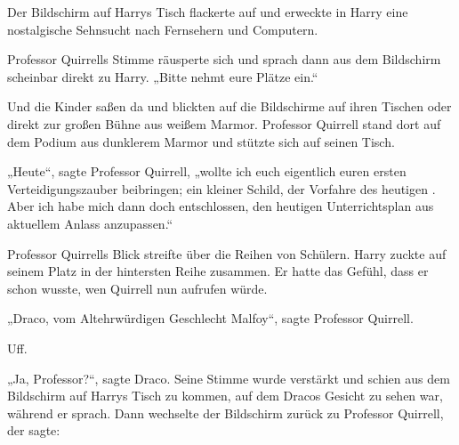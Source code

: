 Der Bildschirm auf Harrys Tisch flackerte auf und erweckte in Harry eine nostalgische Sehnsucht nach Fernsehern und Computern.

Professor Quirrells Stimme räusperte sich und sprach dann aus dem Bildschirm scheinbar direkt zu Harry. „Bitte nehmt eure Plätze ein.“

\later

Und die Kinder saßen da und blickten auf die Bildschirme auf ihren Tischen oder direkt zur großen Bühne aus weißem Marmor. Professor Quirrell stand dort auf dem Podium aus dunklerem Marmor und stützte sich auf seinen Tisch.

„Heute“, sagte Professor Quirrell, „wollte ich euch eigentlich euren ersten Verteidigungszauber beibringen; ein kleiner Schild, der Vorfahre des heutigen . Aber ich habe mich dann doch entschlossen, den heutigen Unterrichtsplan aus aktuellem Anlass anzupassen.“

Professor Quirrells Blick streifte über die Reihen von Schülern. Harry zuckte auf seinem Platz in der hintersten Reihe zusammen. Er hatte das Gefühl, dass er schon wusste, wen Quirrell nun aufrufen würde.

„Draco, vom Altehrwürdigen Geschlecht Malfoy“, sagte Professor Quirrell.

Uff.

„Ja, Professor?“, sagte Draco. Seine Stimme wurde verstärkt und schien aus dem Bildschirm auf Harrys Tisch zu kommen, auf dem Dracos Gesicht zu sehen war, während er sprach. Dann wechselte der Bildschirm zurück zu Professor Quirrell, der sagte:

